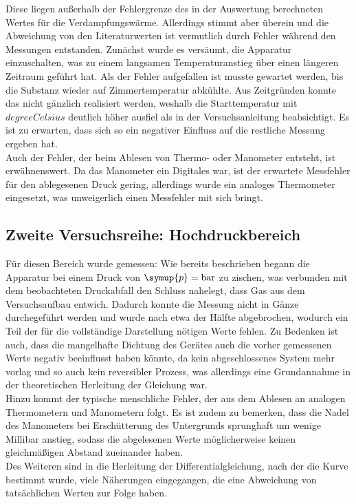 Diese liegen außerhalb der Fehlergrenze des in der Auswertung berechneten Wertes für die 
Verdampfungswärme. Allerdings stimmt aber überein und die Abweichung von den 
Literaturwerten ist vermutlich durch Fehler während den Messungen entstanden.
Zunächst wurde es versäumt, die Apparatur einzuschalten, was zu einem langsamen Temperaturanstieg über einen längeren Zeitraum geführt hat. Als der Fehler aufgefallen
ist musste gewartet werden, bis die Substanz wieder auf Zimmertemperatur abkühlte. Aus Zeitgründen konnte das nicht gänzlich realisiert werden, weshalb die Starttemperatur 
mit $ \si{degreeCelsius}$ deutlich höher ausfiel als in der Versuchsanleitung beabsichtigt. Es ist zu erwarten, dass sich so ein negativer Einfluss auf die restliche Messung
ergeben hat. \\
Auch der Fehler, der beim Ablesen von Thermo- oder Manometer entsteht, ist erwähnenswert. Da das Manometer ein Digitales war, ist der erwartete Messfehler für den ablegesenen 
Druck gering, allerdings wurde ein analoges Thermometer eingesetzt, was unweigerlich einen Messfehler mit sich bringt.

\subsection{Zweite Versuchsreihe: Hochdruckbereich}
Für diesen Bereich wurde gemessen:
Wie bereits beschrieben begann die Apparatur bei einem Druck von $\symup{p} = \si{\bar}$ zu zischen, was verbunden mit dem beobachteten Druckabfall den Schluss nahelegt, dass
Gas aus dem Versuchsaufbau entwich. Dadurch konnte die Messung nicht in Gänze durchegeführt werden und wurde nach etwa der Hälfte abgebrochen, wodurch ein Teil der für die 
vollständige Darstellung nötigen Werte fehlen. Zu Bedenken ist auch, dass die mangelhafte Dichtung des Gerätes auch die vorher gemessenen Werte negativ beeinflusst haben 
könnte, da kein abgeschlossenes System mehr vorlag und so auch kein reversibler Prozess, was allerdings eine Grundannahme in der theoretischen Herleitung der Gleichung war. \\
Hinzu kommt der typische menschliche Fehler, der aus dem Ablesen an analogen Thermometern und Manometern folgt. Es ist zudem zu bemerken, dass die Nadel des Manometers bei 
Erschütterung des Untergrunds sprunghaft um wenige Millibar anstieg, sodass die abgelesenen Werte möglicherweise keinen gleichmäßigen Abstand zueinander haben. \\
Des Weiteren sind in die Herleitung der Differentialgleichung, nach der die Kurve bestimmt wurde, viele Näherungen eingegangen, die eine Abweichung von tatsächlichen Werten
zur Folge haben.
